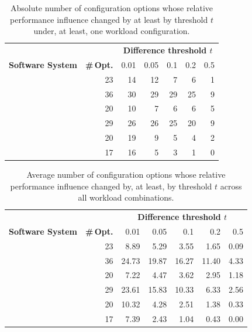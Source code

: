\begin{table}
	\centering
	\caption{Absolute number of configuration options whose relative performance influence changed by at least by threshold $t$ under, at least, one workload configuration.}
	\begin{tabular}{lr|rrrrr}
		\toprule
		& &  \multicolumn{5}{c}{\textbf{Difference threshold $t$}} \\
		\textbf{Software System} & \textbf{\#\,Opt.} & 0.01 &  0.05 &  0.1 &  0.2 &  0.5 \\
		\midrule
		\dconvert & 23 &    14 &    12 &    7 &    6 &    1 \\
		\jumper & 36 &   30 &    29 &   29 &   25 &    9 \\
		\batik &  20 &  10 &     7 &    6 &    6 &    5 \\
		\kanzi & 29 &   26 &    26 &   25 &   20 &    9 \\
		\jadx & 20 &   19 &     9 &    5 &    4 &    2 \\
		\htwo & 17 &   16 &     5 &    3 &    1 &    0 \\
		\bottomrule
	\end{tabular}
	\label{tab:total_changes}
\end{table}
\begin{table}
	\caption{Average number of configuration options whose relative performance influence changed by, at least, by threshold $t$ across all workload combinations.}
	\begin{tabular}{lr|rrrrr}
		\toprule
		& & \multicolumn{5}{c}{\textbf{Difference threshold $t$}} \\
		\textbf{Software System} & \textbf{\#\,Opt.} & 0.01 &  0.05 &  0.1 &  0.2 &  0.5 \\
		\midrule
		\dconvert & 23 &  8.89 &  5.29 &  3.55 &  1.65 & 0.09 \\
		\jumper & 36 & 24.73 & 19.87 & 16.27 & 11.40 & 4.33 \\
		\batik & 20 &  7.22 &  4.47 &  3.62 &  2.95 & 1.18 \\
		\kanzi & 29 & 23.61 & 15.83 & 10.33 &  6.33 & 2.56 \\
		\jadx & 20 & 10.32 &  4.28 &  2.51 &  1.38 & 0.33 \\
		\htwo & 17 & 7.39 &  2.43 &  1.04 &  0.43 & 0.00 \\
		\bottomrule
	\end{tabular}
	\label{tab:average_changes}
\end{table}


